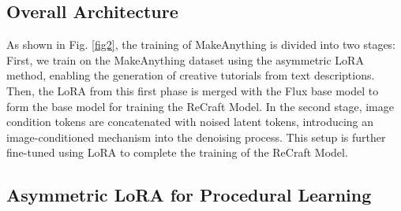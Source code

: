 \subsection{Overall Architecture}

As shown in Fig. \ref{fig2}, the training of MakeAnything is divided into two stages: First, we train on the MakeAnything dataset using the asymmetric LoRA method, enabling the generation of creative tutorials from text descriptions. Then, the LoRA from this first phase is merged with the Flux base model to form the base model for training the ReCraft Model. In the second stage, image condition tokens are concatenated with noised latent tokens, introducing an image-conditioned mechanism into the denoising process. This setup is further fine-tuned using LoRA to complete the training of the ReCraft Model.



\subsection{Asymmetric LoRA for Procedural Learning}




